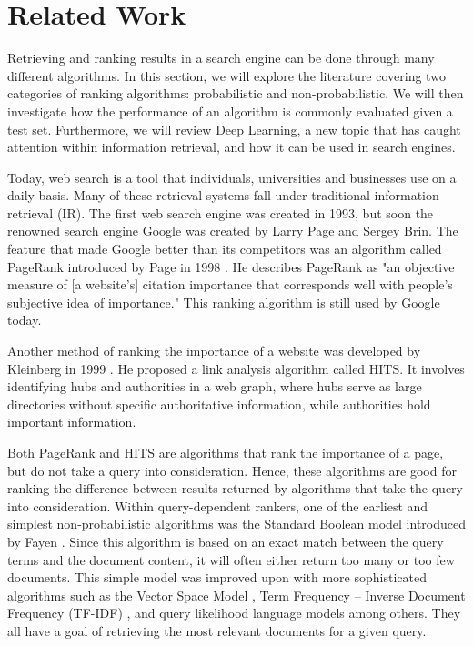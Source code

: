 \section{Related Work}
Retrieving and ranking results in a search engine can be done through many different algorithms. In this section, we will explore the literature covering two categories of ranking algorithms: probabilistic and non-probabilistic. We will then investigate how the performance of an algorithm is commonly evaluated given a test set. Furthermore, we will review Deep Learning, a new topic that has caught attention within information retrieval, and how it can be used in search engines.

Today, web search is a tool that individuals, universities and businesses use on a daily basis. Many of these retrieval systems fall under traditional information retrieval (IR). The first web search engine was created in 1993, but soon the renowned search engine Google was created by Larry Page and Sergey Brin. The feature that made Google better than its competitors was an algorithm called PageRank introduced by Page in 1998 \cite{brin1998anatomy}. He describes PageRank as "an objective measure of [a website's] citation importance that corresponds well with people's subjective idea of importance." This ranking algorithm is still used by Google today.

Another method of ranking the importance of a website was developed by Kleinberg in 1999 \cite{kleinberg1999authoritative}. He proposed a link analysis algorithm called HITS. It involves identifying hubs and authorities in a web graph, where hubs serve as large directories without specific authoritative information, while authorities hold important information. %

Both PageRank and HITS are algorithms that rank the importance of a page, but do not take a query into consideration.
Hence, these algorithms are good for ranking the difference between results returned by algorithms that take the query into consideration.
Within query-dependent rankers, one of the earliest and simplest non-probabilistic algorithms was the Standard Boolean model introduced by Fayen \cite{lancaster1973information}. Since this algorithm is based on an exact match between the query terms and the document content, it will often either return too many or too few documents. This simple model was improved upon with more sophisticated algorithms such as the Vector Space Model \cite{salton1975vector}, Term Frequency -- Inverse Document Frequency (TF-IDF) \cite{salton1983mcgill}, and query likelihood language models \cite{zhai2001model} among others. They all have a goal of retrieving the most relevant documents for a given query.

